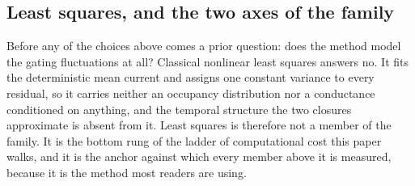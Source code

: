 
\subsection*{Least squares, and the two axes of the family}

Before any of the choices above comes a prior question: does the method model the gating
fluctuations at all? Classical nonlinear least squares answers no. It fits
the deterministic mean current and assigns one constant variance to every residual, so it
carries neither an occupancy distribution nor a conductance conditioned on anything, and
the temporal structure the two closures approximate is absent from it. Least squares is
therefore not a member of the family. It is the bottom rung of the ladder of computational
cost this paper walks, and it is the anchor against which every member above it is
measured, because it is the method most readers are using.

